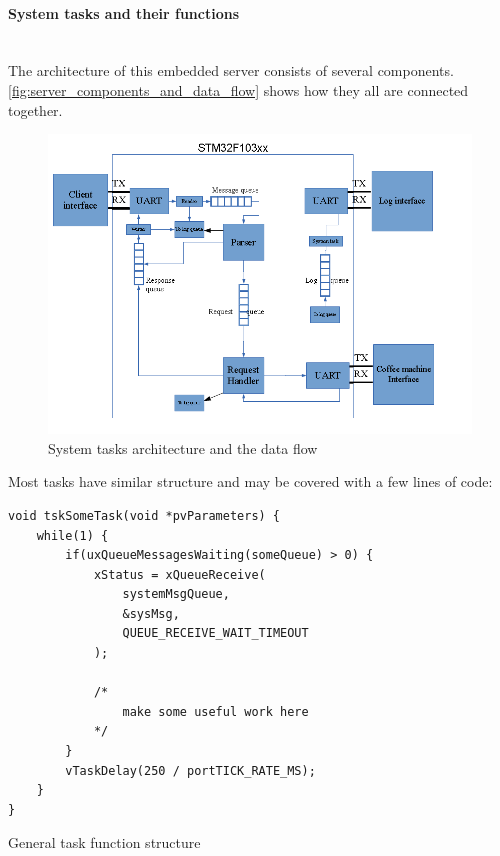 \paragraph{System tasks and their functions} ~\\

The architecture of this embedded server consists of several components.
\autoref{fig:server_components_and_data_flow} shows how they all are connected
together.

\begin{center}
 \begin{figure}[h]
	\includegraphics[width=\textwidth]{../images/implementation/embedded_server/system_tasks_and_data_flow.png}
	\caption{System tasks architecture and  the data flow}
	\label{fig:server_components_and_data_flow}
 \end{figure}
\end{center}

Most tasks have similar structure and may be covered with a few lines of code:


\begin{listing}[H]
\begin{verbatim}
void tskSomeTask(void *pvParameters) {
	while(1) {
		if(uxQueueMessagesWaiting(someQueue) > 0) {
			xStatus = xQueueReceive( 
				systemMsgQueue, 
				&sysMsg, 
				QUEUE_RECEIVE_WAIT_TIMEOUT 
			);
			
			/* 
				make some useful work here
			*/
		}
		vTaskDelay(250 / portTICK_RATE_MS);
	}
}
\end{verbatim}
\caption{General task function structure}
\label{lst:task_function_structure}
\end{listing}

